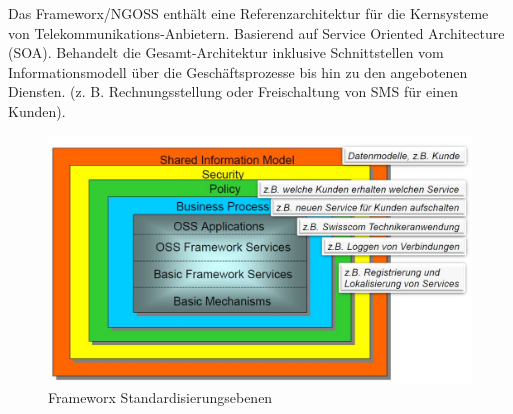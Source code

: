 Das Frameworx/NGOSS enthält eine Referenzarchitektur für die Kernsysteme von Telekommunikations-Anbietern. Basierend auf Service Oriented Architecture (SOA). Behandelt die Gesamt-Architektur inklusive Schnittstellen vom Informationsmodell über die Geschäftsprozesse bis hin zu den angebotenen Diensten. (z. B. Rechnungsstellung oder Freischaltung von SMS für einen Kunden).

\begin{figure}[h!]
\centering
\includegraphics[width=0.7\linewidth]{fig/frameworx-standardisierungsebenen}
\caption{Frameworx Standardisierungsebenen}
\label{fig:frameworx-standardisierungsebenen}
\end{figure}

